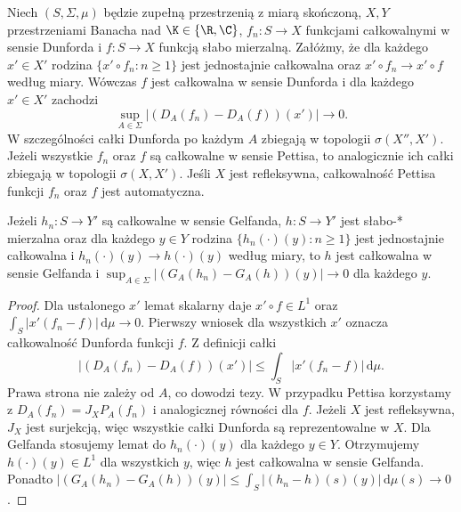 \begin{twierdzenie}
\label{thm:weak-vitali15b}
Niech $(S,\Sigma,\mu)$ będzie zupełną przestrzenią z miarą
skończoną, $X,Y$ przestrzeniami Banacha nad $\K\in\{\R,\C\}$,
$f_n:S\to X$ funkcjami całkowalnymi w sensie Dunforda
i $f:S\to X$ funkcją słabo mierzalną.
Załóżmy, że dla każdego $x'\in X'$ rodzina
$\{x'\circ f_n:n\ge1\}$ jest jednostajnie całkowalna
oraz $x'\circ f_n\to x'\circ f$ według miary.
Wówczas $f$ jest całkowalna w sensie Dunforda i dla
każdego $x'\in X'$ zachodzi
\[
 \sup_{A\in\Sigma}|(D_A(f_n)-D_A(f))(x')|\to0.
\]
W szczególności całki Dunforda po każdym $A$ zbiegają
w topologii $\sigma(X'',X')$. Jeżeli wszystkie $f_n$
oraz $f$ są całkowalne w sensie Pettisa, to analogicznie
ich całki zbiegają w topologii $\sigma(X,X')$.
Jeśli $X$ jest refleksywna, całkowalność Pettisa funkcji
$f_n$ oraz $f$ jest automatyczna.

Jeżeli $h_n:S\to Y'$ są całkowalne w sensie Gelfanda,
$h:S\to Y'$ jest słabo-* mierzalna oraz dla każdego $y\in Y$
rodzina $\{h_n(\cdot)(y):n\ge1\}$ jest jednostajnie
całkowalna i $h_n(\cdot)(y)\to h(\cdot)(y)$ według miary,
to $h$ jest całkowalna w sensie Gelfanda i
$\sup_{A\in\Sigma}|(G_A(h_n)-G_A(h))(y)|\to0$ dla każdego $y$.
\end{twierdzenie}
\begin{proof}
Dla ustalonego $x'$ lemat skalarny daje $x'\circ f\in L^1$
oraz $\int_S|x'(f_n-f)|\,\mathrm d\mu\to0$.
Pierwszy wniosek dla wszystkich $x'$ oznacza całkowalność
Dunforda funkcji $f$. Z definicji całki
\[
 |(D_A(f_n)-D_A(f))(x')|
 \le\int_S|x'(f_n-f)|\,\mathrm d\mu.
\]
Prawa strona nie zależy od $A$, co dowodzi tezy.
W przypadku Pettisa korzystamy z
$D_A(f_n)=J_X P_A(f_n)$ i analogicznej równości dla $f$.
Jeżeli $X$ jest refleksywna, $J_X$ jest surjekcją, więc
wszystkie całki Dunforda są reprezentowalne w $X$.
Dla Gelfanda stosujemy lemat do $h_n(\cdot)(y)$ dla
każdego $y\in Y$. Otrzymujemy $h(\cdot)(y)\in L^1$
dla wszystkich $y$, więc $h$ jest całkowalna w sensie
Gelfanda. Ponadto
$|(G_A(h_n)-G_A(h))(y)|\le
\int_S|(h_n-h)(s)(y)|\,\mathrm d\mu(s)\to0$.
\end{proof}

